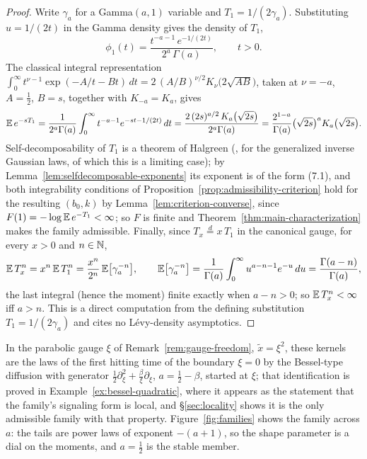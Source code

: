 \begin{proof}
Write $\gamma_a$ for a Gamma$(a,1)$ variable and $T_1 = 1/(2\gamma_a)$. Substituting
$u = 1/(2t)$ in the Gamma density gives the density of $T_1$,
\[
  \phi_1(t) = \frac{t^{-a-1}\,e^{-1/(2t)}}{2^{a}\,\Gamma(a)}, \qquad t > 0 .
\]
The classical integral representation
$\int_0^\infty t^{\nu-1}\exp(-A/t - Bt)\,dt = 2\,(A/B)^{\nu/2}K_\nu\bigl(2\sqrt{AB}\bigr)$,
taken at $\nu = -a$, $A = \tfrac12$, $B = s$, together with $K_{-a} = K_a$, gives
\[
  \mathbb{E}\,e^{-sT_1}
  = \frac{1}{2^{a}\Gamma(a)}\int_0^\infty t^{-a-1}e^{-st - 1/(2t)}\,dt
  = \frac{2\,(2s)^{a/2}\,K_a\bigl(\sqrt{2s}\bigr)}{2^{a}\Gamma(a)}
  = \frac{2^{1-a}}{\Gamma(a)}\bigl(\sqrt{2s}\bigr)^{a}K_a\bigl(\sqrt{2s}\bigr).
\]
Self-decomposability of $T_1$ is a theorem of Halgreen (, for the
generalized inverse Gaussian laws, of which this is a limiting case); by
Lemma~\ref{lem:selfdecomposable-exponents} its exponent is of the form (7.1), and both
integrability conditions of Proposition~\ref{prop:admissibility-criterion} hold for the resulting
$(b_0,k)$ by Lemma~\ref{lem:criterion-converse}, since $F(1) = -\log\mathbb{E}\,e^{-T_1} < \infty$; so
$F$ is finite and Theorem~\ref{thm:main-characterization} makes the family admissible. Finally,
since $T_x \stackrel{d}{=} x\,T_1$ in the canonical gauge, for every $x > 0$ and $n \in \mathbb{N}$,
\[
  \mathbb{E}\,T_x^n = x^n\,\mathbb{E}\,T_1^n = \frac{x^n}{2^n}\,\mathbb{E}\bigl[\gamma_a^{-n}\bigr],
  \qquad
  \mathbb{E}\bigl[\gamma_a^{-n}\bigr]
  = \frac{1}{\Gamma(a)}\int_0^\infty u^{a-n-1}e^{-u}\,du
  = \frac{\Gamma(a-n)}{\Gamma(a)},
\]
the last integral (hence the moment) finite exactly when $a - n > 0$; so $\mathbb{E}\,T_x^n < \infty$ iff
$a > n$. This is a direct computation from the defining substitution $T_1 = 1/(2\gamma_a)$ and
cites no Lévy-density asymptotics.
\end{proof}

In the parabolic gauge $\xi$ of Remark~\ref{rem:gauge-freedom}, $\tilde x = \xi^2$, these
kernels are the laws of the first hitting time of the boundary $\xi = 0$ by the Bessel-type
diffusion with generator $\tfrac12\partial_\xi^2 + \tfrac{\beta}{\xi}\partial_\xi$,
$a = \tfrac12 - \beta$, started at $\xi$; that identification is proved in
Example~\ref{ex:bessel-quadratic}, where it appears as the statement that the family's
signaling form is local, and \S\ref{sec:locality} shows it is the only admissible family with
that property. Figure~\ref{fig:families} shows the family across $a$: the tails are power laws
of exponent $-(a+1)$, so the shape parameter is a dial on the moments, and $a = \tfrac12$ is
the stable member.

